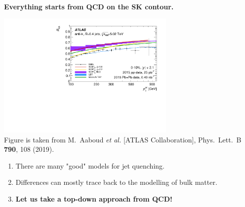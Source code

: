 \documentclass[9pt,a4paper,unknownkeysallowed,xcolor=dvipsnames,aspectratio=43]{beamer}
\begin{document}
%
%
\begin{frame}{\bf\huge Everything starts from QCD on the SK contour.}	\vspace{4mm}
\begin{center}
\includegraphics[width=0.65\textwidth]{fig/RAA_jet}\\
{\tiny  Figure is taken from {\color{teablue}
M.~Aaboud {\it et al.} [ATLAS Collaboration],
  Phys.\ Lett.\ B {\bf 790}, 108 (2019).
  }}
\end{center}
\vspace{2mm}
\begin{enumerate}
\item{\large There are many "good" models for jet quenching.}
\vspace{4mm}
\item{\large Differences can mostly trace back to the modelling of  bulk matter.}
\vspace{4mm}
\item{\large\bf\color{darkred} Let us take a top-down approach from QCD!}
\end{enumerate}
\end{frame}
\end{document}

